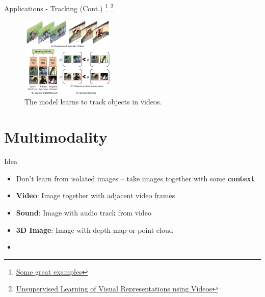 \documentclass[serif, aspectratio=169]{beamer}
\begin{document}
\begin{frame}{Applications - Tracking (Cont.)
\footnote{\href{https://www.cnblogs.com/wangxiaocvpr/p/11838766.html}{Some great examples}}
\footnote{\href{https://arxiv.org/abs/1505.00687}{Unsupervised Learning of Visual Representations using Videos}}}    
    \begin{figure}
        \setlength{\abovecaptionskip}{0pt}
        \setlength{\belowcaptionskip}{1pt}
        \centering
        \includegraphics[width=0.4\textwidth]{pic/ssl-applications/tracking.png}
        \caption{The model learns to track objects in videos.}
   \end{figure}
\end{frame}


\section{Multimodality}


\begin{frame}{Idea}
     
 \begin{itemize}
 \item  Don’t learn from isolated images -- take images together with some \textbf{context}
\item \textbf{Video}: Image together with adjacent video frames
 \item \textbf{Sound}: Image with audio track from video
 \item \textbf{3D Image}: Image with depth map or point cloud
\item  {}

  \end{itemize}
\end{frame}
\end{document}

